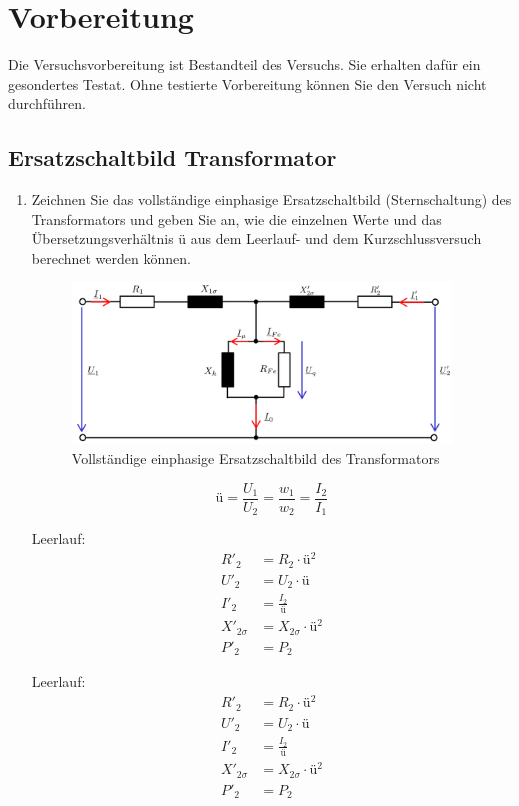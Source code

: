 \section{Vorbereitung}
{Die Versuchsvorbereitung ist Bestandteil des Versuchs. Sie erhalten dafür ein gesondertes Testat.
Ohne testierte Vorbereitung können Sie den Versuch nicht durchführen.}
\subsection{Ersatzschaltbild Transformator}
\begin{enumerate}[label=\alph*)]
  \item Zeichnen Sie das vollständige einphasige Ersatzschaltbild (Sternschaltung) des Transformators und geben Sie an, wie die einzelnen Werte und das Übersetzungsverhältnis ü aus dem Leerlauf- und dem Kurzschlussversuch berechnet werden können. 
    \begin{figure}[h!]
      \begin{center}
        \includegraphics[width=0.95\textwidth]{img/2.1.1.1}
      \end{center}
      \caption{Vollständige einphasige Ersatzschaltbild des Transformators}\label{img:2.1.1.1}
    \end{figure}
    $$ü=\frac{U_1}{U_2}=\frac{w_1}{w_2}=\frac{I_2}{I_1}$$
    \begin{minipage}{0.5\textwidth}
      Leerlauf:
      \begin{align*}
        R'_2&=R_2\cdot ü^2\\ 
        U'_2&=U_2\cdot ü\\ 
        I'_2 &= \frac{I_2}{ü}\\ 
        X'_{2\sigma} &= X_{2\sigma} \cdot ü^2\\ 
        P'_2 &= P_2
      \end{align*}
    \end{minipage}\hfill
    \begin{minipage}{0.5\textwidth}
      Leerlauf:
      \begin{align*}
        R'_2&=R_2\cdot ü^2\\ 
        U'_2&=U_2\cdot ü\\ 
        I'_2 &= \frac{I_2}{ü}\\ 
        X'_{2\sigma} &= X_{2\sigma} \cdot ü^2\\ 
        P'_2 &= P_2
      \end{align*}
    \end{minipage}


\end{enumerate}
